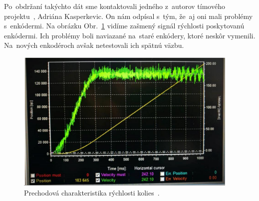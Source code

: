 Po~obdržaní takýchto dát sme kontaktovali jedného z~autorov tímového projektu~\cite{timovyProjekt}, Adriána Kasperkevic. On nám odpísal s~tým,
že~aj oni mali problémy s~enkódermi. Na obrázku Obr.~\ref{fig:prechChar} vidíme zašmený signál rýchlosti poskytovanú enkódermi. Ich problémy
boli naviazané na~staré enkódery, ktoré neskôr vymenili. Na~nových enkodéroch avšak netestovali ich spätnú väzbu.

\begin{figure}[!htbp]
	\begin{center}
		\includegraphics[width=0.95\textwidth]{img/robotSpeedChar.png}
	\end{center}
	\caption{Prechodová charakteristika rýchlosti kolies~\cite{timovyProjekt}. }
	\label{fig:prechChar}
\end{figure}

